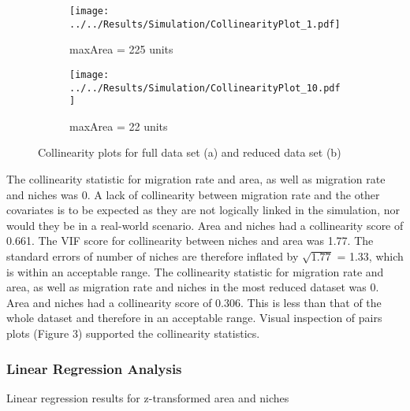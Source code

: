 \documentclass{article}
\begin{document}
\begin{figure}[!h]
  \centering
  \begin{subfigure}[b]{0.4\linewidth}
    \texttt{[image: ../../Results/Simulation/CollinearityPlot\_1.pdf]}
    \caption{maxArea = 225 units}
  \end{subfigure}
  \begin{subfigure}[b]{0.4\linewidth}
    \texttt{[image: ../../Results/Simulation/CollinearityPlot\_10.pdf]}
    \caption{maxArea = 22 units}
  \end{subfigure}
  \caption{Collinearity plots for full data set (a) and reduced data set (b)}
  \label{fig:Collinearity}
\end{figure}

The collinearity statistic for migration rate and area, as well as migration rate and niches was 0. A lack of collinearity between migration rate and the other covariates is to be expected as they are not logically linked in the simulation, nor would they be in a real-world scenario. Area and niches had a collinearity score of 0.661. The VIF score for collinearity between niches and area was 1.77. The standard errors of number of niches are therefore inflated by $\sqrt{1.77}$ = 1.33, which is within an acceptable range. 
The collinearity statistic for migration rate and area, as well as migration rate and niches in the most reduced dataset was 0. Area and niches had a collinearity score of 0.306. This is less than that of the whole dataset and therefore in an acceptable range. Visual inspection of pairs plots (Figure 3) supported the collinearity statistics. 

\subsubsection{Linear Regression Analysis}

\begin{table}[h!]
\centering
\caption{Linear regression results for z-transformed area and niches}
   \end{table}\bigskip
\end{document}
